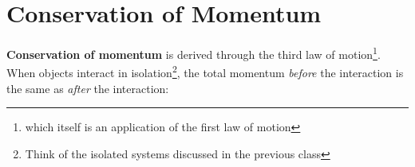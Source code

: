 \section{Conservation of Momentum}

\textbf{Conservation of momentum} is derived through the third law of
motion\footnote{which itself is an application of the first law of motion}.
When objects interact in isolation\footnote{Think of the isolated systems
discussed in the previous class}, the total momentum \emph{before} the
interaction is the same as \emph{after} the interaction:
%
%
%
%
%
%
%



